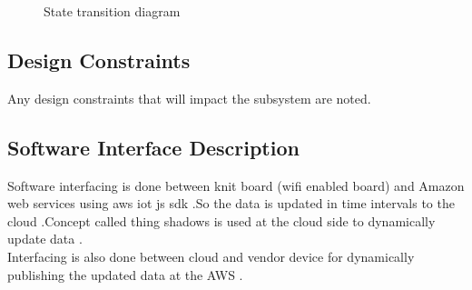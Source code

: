 \documentclass[oneside,a4paper,12pt]{report}
\begin{document}
\begin{center}
	\begin{figure}[!htbp]
		\centering
	  \caption{State transition diagram}
	  \label{fig:state-dig}
	\end{figure}
\end{center} 
\newpage
 \subsection{Design Constraints}	
Any design constraints that will impact the subsystem are noted.
 \subsection{Software Interface Description}	 
Software interfacing is done between knit board (wifi enabled board) and Amazon web services  using aws iot js sdk .So the data is updated in time intervals to the cloud .Concept called thing shadows is used at the cloud side to dynamically update data .\\
Interfacing is also done between cloud and vendor device for dynamically publishing the updated data at the AWS .
\end{document}
